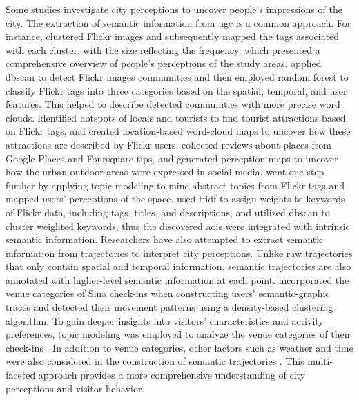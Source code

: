 \documentclass{article}
\theoremstyle{remark}
\begin{document}
Some studies investigate city perceptions to uncover people's impressions of the city. The extraction of semantic information from \acrshort{ugc} is a common approach. For instance, \cite{dunkel_visualizing_2015} clustered Flickr images and subsequently mapped the tags associated with each cluster, with the size reflecting the frequency, which presented a comprehensive overview of people's perceptions of the study areas. \cite{zhou_detecting_2015} applied \acrshort{dbscan} to detect Flickr images communities and then employed random forest to classify Flickr tags into three categories based on the spatial, temporal, and user features. This helped to describe detected communities with more precise word clouds. \cite{li_analyzing_2018} identified hotspots of locals and tourists to find tourist attractions based on Flickr tags, and created location-based word-cloud maps to uncover how these attractions are described by Flickr users. \cite{santos_uncovering_2018} collected reviews about places from Google Places and Foursquare tips, and generated perception maps to uncover how the urban outdoor areas were expressed in social media. \cite{bahrehdar_description_2018} went one step further by applying topic modeling to mine abstract topics from Flickr tags and mapped users' perceptions of the space. \cite{jailani_machine_2021} used \acrfull{tfidf} to assign weights to keywords of Flickr data, including tags, titles, and descriptions, and utilized \acrshort{dbscan} to cluster weighted keywords, thus the discovered \acrshort{aoi}s were integrated with intrinsic semantic information. Researchers have also attempted to extract semantic information from trajectories to interpret city perceptions. Unlike raw trajectories that only contain spatial and temporal information, semantic trajectories are also annotated with higher-level semantic information at each point. \cite{wan_semantic-geographic_2017} incorporated the venue categories of Sina check-ins when constructing users' semantic-graphic traces and detected their movement patterns using a density-based clustering algorithm. To gain deeper insights into visitors' characteristics and activity preferences, topic modeling was employed to analyze the venue categories of their check-ins \citep{vu_discovering_2019, ferreira_uncovering_2020}. In addition to venue categories, other factors such as weather and time were also considered in the construction of semantic trajectories \citep{cai_mining_2018,liu_stccd_2020}. This multi-faceted approach provides a more comprehensive understanding of city perceptions and visitor behavior.
\end{document}
